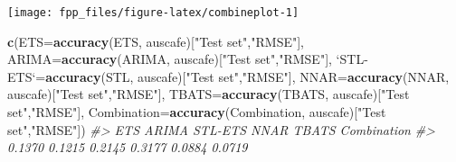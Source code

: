 \documentclass[]{book}
\newenvironment{Shaded}{\begin{snugshade}}{\end{snugshade}}
\newcommand{\CommentTok}[1]{\textcolor[rgb]{0.56,0.35,0.01}{\textit{#1}}}
\newcommand{\DataTypeTok}[1]{\textcolor[rgb]{0.13,0.29,0.53}{#1}}
\newcommand{\KeywordTok}[1]{\textcolor[rgb]{0.13,0.29,0.53}{\textbf{#1}}}
\newcommand{\NormalTok}[1]{#1}
\newcommand{\OperatorTok}[1]{\textcolor[rgb]{0.81,0.36,0.00}{\textbf{#1}}}
\newcommand{\StringTok}[1]{\textcolor[rgb]{0.31,0.60,0.02}{#1}}
\begin{document}
\begin{Shaded}
\end{Shaded}

\begin{center}\texttt{[image: fpp\_files/figure-latex/combineplot-1]} \end{center}

\begin{Shaded}
\begin{Highlighting}[]
\KeywordTok{c}\NormalTok{(}\DataTypeTok{ETS=}\KeywordTok{accuracy}\NormalTok{(ETS, auscafe)[}\StringTok{"Test set"}\NormalTok{,}\StringTok{"RMSE"}\NormalTok{],}
  \DataTypeTok{ARIMA=}\KeywordTok{accuracy}\NormalTok{(ARIMA, auscafe)[}\StringTok{"Test set"}\NormalTok{,}\StringTok{"RMSE"}\NormalTok{],}
  \StringTok{`}\DataTypeTok{STL-ETS}\StringTok{`}\NormalTok{=}\KeywordTok{accuracy}\NormalTok{(STL, auscafe)[}\StringTok{"Test set"}\NormalTok{,}\StringTok{"RMSE"}\NormalTok{],}
  \DataTypeTok{NNAR=}\KeywordTok{accuracy}\NormalTok{(NNAR, auscafe)[}\StringTok{"Test set"}\NormalTok{,}\StringTok{"RMSE"}\NormalTok{],}
  \DataTypeTok{TBATS=}\KeywordTok{accuracy}\NormalTok{(TBATS, auscafe)[}\StringTok{"Test set"}\NormalTok{,}\StringTok{"RMSE"}\NormalTok{],}
  \DataTypeTok{Combination=}\KeywordTok{accuracy}\NormalTok{(Combination, auscafe)[}\StringTok{"Test set"}\NormalTok{,}\StringTok{"RMSE"}\NormalTok{])}
\CommentTok{#>         ETS       ARIMA     STL-ETS        NNAR       TBATS Combination }
\CommentTok{#>      0.1370      0.1215      0.2145      0.3177      0.0884      0.0719}
\end{Highlighting}
\end{Shaded}
\end{document}
